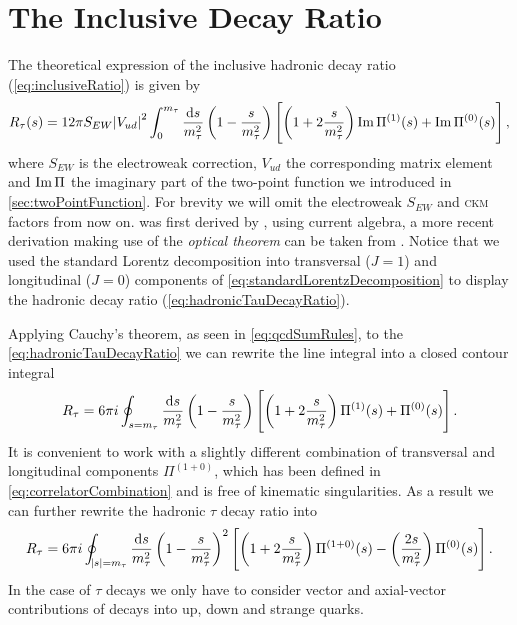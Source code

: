 \documentclass[../../index.tex]{subfiles}
\begin{document}
\section{The Inclusive Decay Ratio}
The theoretical expression of the inclusive hadronic decay ratio
(\cref{eq:inclusiveRatio}) is given by
\begin{equation}
  \label{eq:hadronicTauDecayRatio}
  R_\tau(s) = 12 \pi S_{EW} \abs{V_{ud}}^2 \int_0^{m_\tau} \frac{\dif s}{m_\tau^2}
  \left( 1 - \frac{s}{m_\tau^2} \right)
  \left[ \left( 1 + 2 \frac{s}{m_\tau^2} \right) \Ima \Pi^{(1)}(s) + \Ima \Pi^{(0)}(s) \right],
\end{equation}
where \(S_{EW}\) is the electroweak correction, \(V_{ud}\) the corresponding
 matrix element and $\operatorname{Im} \Pi$ the
imaginary part of the two-point function we introduced in
\cref{sec:twoPointFunction}. For brevity we will omit the electroweak \(S_{EW}\)
and \textsc{ckm} factors from now on.  was first
derived by \cite{Tsai1971}, using current algebra, a more recent derivation
making use of the \textit{optical theorem} can be taken from \cite{Schwab2002}.
Notice that we used the standard Lorentz decomposition into transversal
(\(J=1\)) and longitudinal (\(J=0\)) components of
\cref{eq:standardLorentzDecomposition} to display the hadronic decay ratio
(\cref{eq:hadronicTauDecayRatio}).

Applying Cauchy's theorem, as seen in \cref{eq:qcdSumRules}, to the
\cref{eq:hadronicTauDecayRatio} we can rewrite the line integral into a closed
contour integral
\begin{equation}
  \label{eq:rTauT+L}
  R_\tau = 6 \pi i \oint_{s=m_\tau} \frac{\dif s}{m_\tau^2}
  \left( 1 - \frac{s}{m_\tau^2} \right)
  \left[ \left( 1 + 2 \frac{s}{m_\tau^2} \right) \Pi^{(1)}(s) + \Pi^{(0)}(s) \right].
\end{equation}
It is convenient to work with a slightly different combination of transversal
and longitudinal components \(\Pi^{(1+0)}\), which has been defined in
\cref{eq:correlatorCombination} and is free of kinematic singularities. As a
result we can further rewrite the hadronic \(\tau\) decay ratio into
\begin{equation}
  \label{eq:tauDecayRatioTL}
  R_\tau = 6 \pi i \oint_{\abs{s}=m_\tau} \frac{\dif s}{m_\tau^2}
  \left( 1 - \frac{s}{m_\tau^2} \right)^2
  \left[ \left( 1 + 2 \frac{s}{m_\tau^2} \right) \Pi^{(1+0)}(s) - \left( \frac{2 s}{m_\tau^2} \right) \Pi^{(0)}(s) \right].
\end{equation}
In the case of \(\tau\) decays we only have to consider vector and axial-vector
contributions of decays into up, down and strange quarks.
\end{document}
